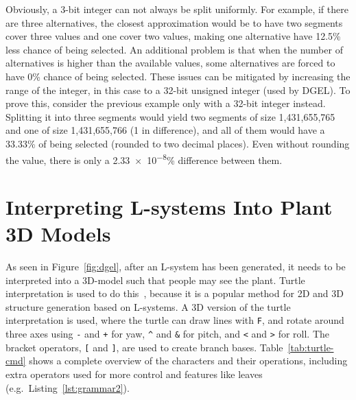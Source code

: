 Obviously, a 3-bit integer can not always be split uniformly.
For example, if there are three alternatives, the closest approximation would be to have two segments cover three values and one cover two values, making one alternative have 12.5\% less chance of being selected.
An additional problem is that when the number of alternatives is higher than the available values, some alternatives are forced to have 0\% chance of being selected.
These issues can be mitigated by increasing the range of the integer, in this case to a 32-bit unsigned integer (used by \gls{DGEL}).
To prove this, consider the previous example only with a 32-bit integer instead.
Splitting it into three segments would yield two segments of size 1,431,655,765 and one of size 1,431,655,766 (1 in difference), and all of them would have a 33.33\% of being selected (rounded to two decimal places).
Even without rounding the value, there is only a \num{2.33e-8}\% difference between them.

\section{Interpreting L-systems Into Plant 3D Models}
\label{sec:interpreting}
As seen in Figure~\ref{fig:dgel}, after an \gls{L-system} has been generated, it needs to be interpreted into a 3D-model such that people may see the plant.
Turtle interpretation is used to do this~\cite{2012Prusinkiewicz}, because it is a popular method for 2D and 3D structure generation based on \glspl{L-system}.
A 3D version of the turtle interpretation is used, where the turtle can draw lines with \texttt{F}, and rotate around three axes using \texttt{-} and \texttt{+} for yaw, \texttt{\textasciicircum} and \texttt{\&} for pitch, and \texttt{<} and \texttt{>} for roll.
The bracket operators, \texttt{[} and \texttt{]}, are used to create \glspl{branch base}.
Table~\ref{tab:turtle-cmd} shows a complete overview of the characters and their operations, including extra operators used for more control and features like leaves (e.g.\ Listing~\ref{lst:grammar2}).

